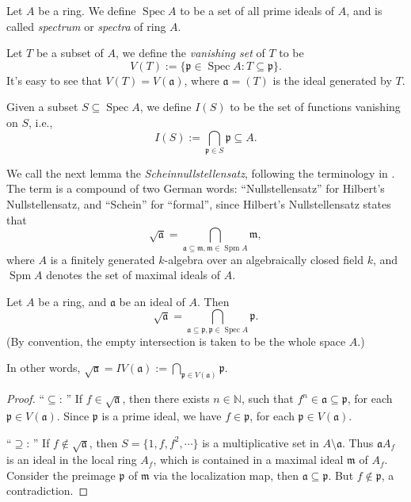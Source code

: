 \documentclass[11pt]{article}
\newcommand{\Spec}{\operatorname{Spec}}
\newcommand{\Spm}{\operatorname{Spm}}
\begin{document}
\begin{definition}
    Let $A$ be a ring. 
    We define $\Spec A$ to be a set of all prime ideals of $A$, 
    and is called \emph{spectrum} or \emph{spectra} of ring $A$. 
    
    Let $ T $ be a subset of $ A $, we define the \emph{vanishing set} of $ T $ to be 
    $$ V(T):=\{\mathfrak{p} \in \Spec A : T \subseteq \mathfrak{p}\}. $$
    It's easy to see that $ V(T)=V(\mathfrak{a}) $, where $ \mathfrak{a}=(T) $ 
    is the ideal generated by $ T $. 

    Given a subset $ S \subseteq \Spec A $, we define $ I(S) $ to be the set of functions 
    vanishing on $ S $, i.e., 
    $$ I(S) := \bigcap_{\mathfrak{p} \in S} \mathfrak{p} \subseteq A. $$  
\end{definition}


We call the next lemma the \emph{Scheinnullstellensatz}, 
following the terminology in \cite{altman}. 
The term is a compound of two German words: ``Nullstellensatz'' for 
Hilbert's Nullstellensatz, and ``Schein'' for ``formal'', 
since Hilbert's Nullstellensatz states that 
$$ \sqrt{\mathfrak{a}} = \bigcap_{\mathfrak{a} \subseteq \mathfrak{m}, \mathfrak{m} \in \Spm A} 
\mathfrak{m}, $$
where $ A $ is a finitely generated $ k $-algebra over an algebraically closed field $ k $, 
and $ \Spm A $ denotes the set of maximal ideals of $ A $. 


\begin{lemma}[Scheinnullstellensatz]
    \label{lemma: Scheinnullstellensatz}
    Let $ A $ be a ring, and $ \mathfrak{a} $ be an ideal of $ A $. 
    Then $$ \sqrt{\mathfrak{a}} = \bigcap_{\mathfrak{a} \subseteq \mathfrak{p}, \mathfrak{p} \in \Spec A} 
    \mathfrak{p}. $$
    (By convention, the empty intersection is taken to be the whole space $ A $.)

    In other words, $ \sqrt{\mathfrak{a}} = I V(\mathfrak{a}):= \bigcap_{\mathfrak{p} \in V(\mathfrak{a})} \mathfrak{p}  $. 
\end{lemma}

\begin{proof}
    ``$ \subseteq $: '' If $ f \in \sqrt{\mathfrak{a}} $, then there exists $ n \in \mathbb{N} $, 
    such that $ f^{n} \in \mathfrak{a} \subseteq \mathfrak{p} $, for each $ \mathfrak{p} \in V(\mathfrak{a}) $. 
    Since $ \mathfrak{p} $ is a prime ideal, we have $ f \in \mathfrak{p} $, for each $ \mathfrak{p} \in V(\mathfrak{a}) $. 

    ``$ \supseteq $: '' If $ f \notin \sqrt{\mathfrak{a}} $, 
    then $ S = \{1,f,f^{2},\cdots \} $ is a multiplicative set in $ A \setminus \mathfrak{a} $. 
    Thus $ \mathfrak{a}A_{f} $ is an ideal in the local ring $ A_{f} $, which is contained in a maximal ideal 
    $ \mathfrak{m} $ of $ A_{f} $. Consider the preimage $ \mathfrak{p} $ of $ \mathfrak{m} $ 
    via the localization map, then $ \mathfrak{a} \subseteq \mathfrak{p} $. 
    But $ f \notin \mathfrak{p} $, a contradiction. 
\end{proof}
\end{document}
